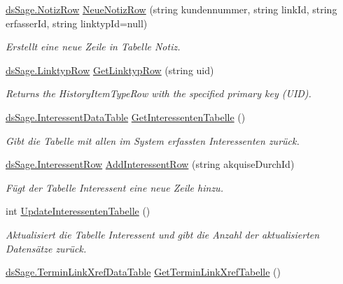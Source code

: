 \begin{DoxyCompactItemize}
\item 
\hyperlink{class_products_1_1_data_1_1ds_sage_1_1_notiz_row}{ds\+Sage.\+Notiz\+Row} \hyperlink{class_products_1_1_data_1_1_data_service_a219d74c885f75295aa36e7d7234401d7}{Neue\+Notiz\+Row} (string kundennummer, string link\+Id, string erfasser\+Id, string linktyp\+Id=null)
\begin{DoxyCompactList}\small\item\em Erstellt eine neue Zeile in Tabelle Notiz. \end{DoxyCompactList}\item 
\hyperlink{class_products_1_1_data_1_1ds_sage_1_1_linktyp_row}{ds\+Sage.\+Linktyp\+Row} \hyperlink{class_products_1_1_data_1_1_data_service_a61981df5960f6d7885072ec697472aa7}{Get\+Linktyp\+Row} (string uid)
\begin{DoxyCompactList}\small\item\em Returns the History\+Item\+Type\+Row with the specified primary key (U\+ID). \end{DoxyCompactList}\item 
\hyperlink{class_products_1_1_data_1_1ds_sage_1_1_interessent_data_table}{ds\+Sage.\+Interessent\+Data\+Table} \hyperlink{class_products_1_1_data_1_1_data_service_abfa6c7b8f4e5f3440d8df78d52981562}{Get\+Interessenten\+Tabelle} ()
\begin{DoxyCompactList}\small\item\em Gibt die Tabelle mit allen im System erfassten Interessenten zurück. \end{DoxyCompactList}\item 
\hyperlink{class_products_1_1_data_1_1ds_sage_1_1_interessent_row}{ds\+Sage.\+Interessent\+Row} \hyperlink{class_products_1_1_data_1_1_data_service_af3470b7234368eefce00c75c2278e9cc}{Add\+Interessent\+Row} (string akquise\+Durch\+Id)
\begin{DoxyCompactList}\small\item\em Fügt der Tabelle Interessent eine neue Zeile hinzu. \end{DoxyCompactList}\item 
int \hyperlink{class_products_1_1_data_1_1_data_service_aa0ff9b6a9ff50ae600a8709fe0cbfb6b}{Update\+Interessenten\+Tabelle} ()
\begin{DoxyCompactList}\small\item\em Aktualisiert die Tabelle Interessent und gibt die Anzahl der aktualisierten Datensätze zurück. \end{DoxyCompactList}\item 
\hyperlink{class_products_1_1_data_1_1ds_sage_1_1_termin_link_xref_data_table}{ds\+Sage.\+Termin\+Link\+Xref\+Data\+Table} \hyperlink{class_products_1_1_data_1_1_data_service_adbe4b859c472f0bb87fe8b3fe4af6066}{Get\+Termin\+Link\+Xref\+Tabelle} ()

\end{DoxyCompactItemize}
